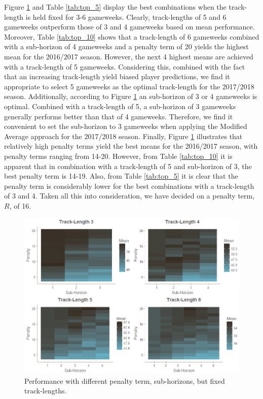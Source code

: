 Figure \ref{fig:fixed_f_hor} and Table \ref{tab:top_5} display the best combinations when the track-length is held fixed for 3-6 gameweeks. Clearly, track-lengths of 5 and 6 gameweeks outperform those of 3 and 4 gameweeks based on mean performance. Moreover, Table \ref{tab:top_10} shows that a track-length of 6 gameweeks combined with a sub-horizon of 4 gameweeks and a penalty term of 20 yields the highest mean for the 2016/2017 season. However, the next 4 highest means are achieved with a track-length of 5 gameweeks. Considering this, combined with the fact that an increasing track-length yield biased player predictions, we find it appropriate to select 5 gameweeks as the optimal track-length for the 2017/2018 season. Additionally, according to Figure \ref{fig:fixed_f_hor} an sub-horizon of 3 or 4 gameweeks is optimal. Combined with a track-length of 5, a sub-horizon of 3 gameweeks generally performs better than that of 4 gameweeks. Therefore, we find it convenient to set the sub-horizon to 3 gameweeks when applying the Modified Average approach for the 2017/2018 season. Finally, Figure \ref{fig:fixed_f_hor} illustrates that relatively high penalty terms yield the best means for the 2016/2017 season, with penalty terms ranging from 14-20. However, from Table \ref{tab:top_10} it is apparent that in combination with a track-length of 5 and sub-horizon of 3, the best penalty term is 14-19. Also, from Table \ref{tab:top_5} it is clear that the penalty term is considerably lower for the best combinations with a track-length of 3 and 4. Taken all this into consideration, we have decided on a penalty term, $R$, of 16.


\begin{figure}[H]
    \centering
    \includegraphics[scale=0.55]{fig/chapter_6/paramter_choice_fixed_f_hor.png}
    \caption{Performance with different penalty term, sub-horizons, but fixed track-lengths.}
\label{fig:fixed_f_hor}    
\end{figure}

